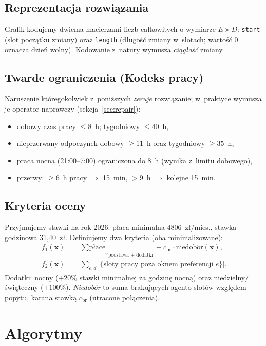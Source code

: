 \documentclass[11pt,a4paper]{article}
\begin{document}
\subsection{Reprezentacja rozwi\k{a}zania}
Grafik kodujemy dwiema macierzami liczb ca\l kowitych o wymiarze $E\times D$:
\texttt{start} (slot pocz\k{a}tku zmiany) oraz \texttt{length} (d\l ugo\'s\'c zmiany
w~slotach; warto\'s\'c 0 oznacza dzie\'n wolny). Kodowanie z~natury wymusza
\emph{ci\k{a}g\l o\'s\'c} zmiany.

\subsection{Twarde ograniczenia (Kodeks pracy)}
\label{sec:hard}
Naruszenie kt\'oregokolwiek z~poni\.zszych \emph{zeruje} rozwi\k{a}zanie; w~praktyce
wymusza je operator naprawczy (sekcja~\ref{sec:repair}):
\begin{itemize}[noitemsep]
  \item dobowy czas pracy $\le 8$~h; tygodniowy $\le 40$~h,
  \item nieprzerwany odpoczynek dobowy $\ge 11$~h oraz tygodniowy $\ge 35$~h,
  \item praca nocna (21:00--7:00) ograniczona do 8~h (wynika z~limitu dobowego),
  \item przerwy: $\ge 6$~h pracy $\Rightarrow$ 15~min, $>9$~h $\Rightarrow$ kolejne 15~min.
\end{itemize}

\subsection{Kryteria oceny}
\label{sec:obj}
Przyjmujemy stawki na rok 2026: p\l aca minimalna 4806~z\l/mies., stawka godzinowa
31{,}40~z\l. Definiujemy dwa kryteria (oba minimalizowane):
\begin{align}
  f_1(\mathbf{x}) &= \underbrace{\textstyle\sum \text{p\l ace}}_{\text{podstawa + dodatki}}
    + c_{\text{br}}\cdot \mathrm{niedob\acute{o}r}(\mathbf{x}), \\
  f_2(\mathbf{x}) &= \textstyle\sum_{e,d}\big|\{\text{sloty pracy poza oknem preferencji } e\}\big|.
\end{align}
Dodatki: nocny ($+20\%$ stawki minimalnej za godzin\k{e} nocn\k{a}) oraz niedzielny/
\'swi\k{a}teczny ($+100\%$). \emph{Niedob\'or} to suma brakuj\k{a}cych agento-slot\'ow
wzgl\k{e}dem popytu, karana stawk\k{a} $c_{\text{br}}$ (utracone po\l \k{a}czenia).

\section{Algorytmy}
\label{sec:algo}
\end{document}
